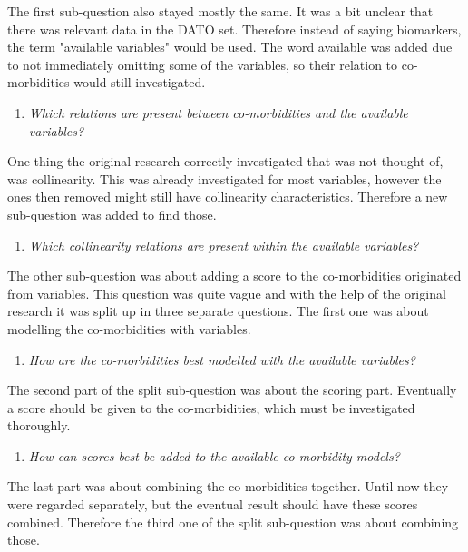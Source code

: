 \documentclass[10pt,a4paper]{article}
\begin{document}
	The first sub-question also stayed mostly the same. It was a bit unclear that there was relevant data in the DATO set. Therefore instead of saying biomarkers, the term "available variables" would be used. The word available was added due to not immediately omitting some of the variables, so their relation to co-morbidities would still investigated.
	
	\begin{enumerate}
		\item \emph{Which relations are present between co-morbidities and the available variables?}
	\end{enumerate}
	
	One thing the original research correctly investigated that was not thought of, was collinearity. This was already investigated for most variables, however the ones then removed might still have collinearity characteristics. Therefore a new sub-question was added to find those.
	
	\begin{enumerate}[resume]
		\item \emph{Which collinearity relations are present within the available variables?}
	\end{enumerate}
		
	The other sub-question was about adding a score to the co-morbidities originated from variables. This question was quite vague and with the help of the original research it was split up in three separate questions. The first one was about modelling the co-morbidities with variables.
	
	\begin{enumerate}[resume]
		\item \emph{How are the co-morbidities best modelled with the available variables?}
	\end{enumerate}
	
	The second part of the split sub-question was about the scoring part. Eventually a score should be given to the co-morbidities, which must be investigated thoroughly.
	
	\begin{enumerate}[resume]
		\item \emph{How can scores best be added to the available co-morbidity models?}
	\end{enumerate}
	
	The last part was about combining the co-morbidities together. Until now they were regarded separately, but the eventual result should have these scores combined. Therefore the third one of the split sub-question was about combining those.
	
\end{document}
